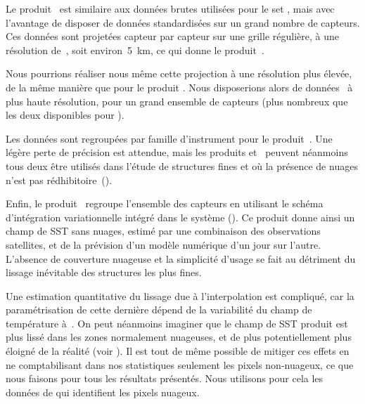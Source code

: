 Le produit~ est similaire aux données brutes utilisées pour le set , mais avec l'avantage de disposer de données standardisées sur un grand nombre de capteurs.
Ces données sont projetées capteur par capteur sur une grille régulière, à une résolution de~, soit environ~\qty{5}{\km}, ce qui donne le produit~.

\begin{note}
  Nous pourrions réaliser nous même cette projection à une résolution plus élevée, de la même manière que pour le produit .
  Nous disposerions alors de données~ à plus haute résolution, pour un grand ensemble de capteurs (plus nombreux que les deux disponibles pour ).
\end{note}

Les données sont regroupées par famille d'instrument pour le produit~. Une légère perte de précision est attendue, mais les produits  et~ peuvent néanmoins tous deux être utilisés dans l'étude de structures fines et où la présence de nuages n'est pas rédhibitoire~(\cite{merchant_2019}).

Enfin, le produit~ regroupe l'ensemble des capteurs en utilisant le schéma d'intégration variationnelle  intégré dans le système  (\cite{good_2020}).
Ce produit donne ainsi un champ de SST sans nuages, estimé par une combinaison des observations satellites, et de la prévision d'un modèle numérique d'un jour sur l'autre.
L'absence de couverture nuageuse et la simplicité d'usage se fait au détriment du lissage inévitable des structures les plus fines.

Une estimation quantitative du lissage due à l'interpolation est compliqué, car la paramétrisation de cette dernière dépend de la variabilité du champ de température à~.
On peut néanmoins imaginer que le champ de SST produit est plus lissé dans les zones normalement nuageuses, et de plus potentiellement plus éloigné de la réalité (voir ).
Il est tout de même possible de mitiger ces effets en ne comptabilisant dans nos statistiques seulement les pixels non-nuageux, ce que nous faisons pour tous les résultats présentés.
Nous utilisons pour cela les données de  qui identifient les pixels nuageux.


